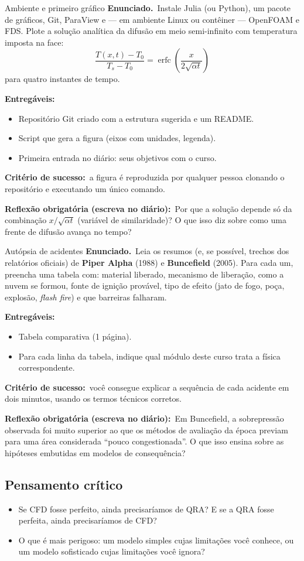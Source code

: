 \documentclass[10pt,a4paper,twocolumn,openany]{report}
\newenvironment{critico}{\subsection*{\textcolor{roxo}{Pensamento crítico}}}{\par}
\newcommand{\enunciado}{\noindent\textbf{Enunciado.}\ }
\newcommand{\entregaveis}{\par\medskip\noindent\textbf{Entregáveis:}}
\newcommand{\criterio}{\par\medskip\noindent\textbf{Critério de sucesso:}\ }
\newcommand{\reflexao}{\par\medskip\noindent\textbf{Reflexão obrigatória (escreva no diário):}}
\begin{document}
\begin{tarefa}{Ambiente e primeiro gráfico}
\enunciado Instale Julia (ou Python), um pacote de gráficos, Git, ParaView e
--- em ambiente Linux ou contêiner --- OpenFOAM e FDS. Plote a solução
analítica da difusão em meio semi-infinito com temperatura imposta na face:
\[
  \frac{T(x,t)-T_0}{T_s-T_0} = \operatorname{erfc}\!\left(\frac{x}{2\sqrt{\alpha t}}\right)
\]
para quatro instantes de tempo.
\entregaveis
\begin{itemize}
  \item Repositório Git criado com a estrutura sugerida e um README.
  \item Script que gera a figura (eixos com unidades, legenda).
  \item Primeira entrada no diário: seus objetivos com o curso.
\end{itemize}
\criterio a figura é reproduzida por qualquer pessoa clonando o repositório
e executando um único comando.
\reflexao\ Por que a solução depende só da combinação $x/\sqrt{\alpha t}$
(variável de similaridade)? O que isso diz sobre como uma frente de difusão
avança no tempo?
\end{tarefa}

\begin{tarefa}{Autópsia de acidentes}
\enunciado Leia os resumos (e, se possível, trechos dos relatórios oficiais)
de \textbf{Piper Alpha} (1988) e \textbf{Buncefield} (2005). Para cada um,
preencha uma tabela com: material liberado, mecanismo de liberação, como a
nuvem se formou, fonte de ignição provável, tipo de efeito (jato de fogo,
poça, explosão, \emph{flash fire}) e que barreiras falharam.
\entregaveis
\begin{itemize}
  \item Tabela comparativa (1 página).
  \item Para cada linha da tabela, indique qual módulo deste curso trata a
        física correspondente.
\end{itemize}
\criterio você consegue explicar a sequência de cada acidente em dois minutos,
usando os termos técnicos corretos.
\reflexao\ Em Buncefield, a sobrepressão observada foi muito superior ao
que os métodos de avaliação da época previam para uma área considerada
``pouco congestionada''. O que isso ensina sobre as hipóteses embutidas em
modelos de consequência?
\end{tarefa}

\begin{critico}
\begin{itemize}
  \item Se CFD fosse perfeito, ainda precisaríamos de QRA? E se a QRA fosse
        perfeita, ainda precisaríamos de CFD?
  \item O que é mais perigoso: um modelo simples cujas limitações você
        conhece, ou um modelo sofisticado cujas limitações você ignora?
\end{itemize}
\end{critico}
\end{document}
